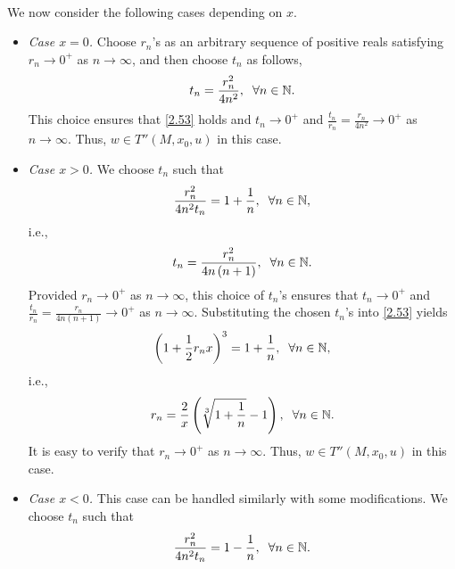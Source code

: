 \documentclass[a4paper]{article}
\numberwithin{equation}{section}
\begin{document}
\begin{enumerate}
\begin{enumerate}
\begin{align}
\end{align}
We now consider the following cases depending on $x$.
\begin{itemize}
\item \textit{Case $x=0$.} Choose $r_n$'s as an arbitrary sequence of positive reals satisfying $r_n\to 0^+$ as $n\to \infty$, and then choose $t_n$ as follows, 
\begin{align}
{t_n} = \frac{{r_n^2}}{{4{n^2}}},\hspace{0.2cm}\forall n \in \mathbb{N}.
\end{align}
This choice ensures that \eqref{2.53} holds and $t_n\to 0^+$ and $\frac{{{t_n}}}{{{r_n}}} = \frac{{{r_n}}}{{4{n^2}}} \to 0^+$ as $n\to \infty$. Thus, $w\in T''\left(M,x_0,u\right)$ in this case.
\item \textit{Case $x>0$.} We choose $t_n$ such that
\begin{align}
\frac{{r_n^2}}{{4{n^2}{t_n}}} = 1 + \frac{1}{n},\hspace{0.2cm}\forall n \in \mathbb{N},
\end{align}
i.e.,
\begin{align}
{t_n} = \frac{{r_n^2}}{{4n\left( {n + 1} \right)}},\hspace{0.2cm}\forall n \in \mathbb{N}.
\end{align}
Provided $r_n\to 0^+$ as $n\to \infty$, this choice of $t_n$'s ensures that $t_n\to 0^+$ and $\frac{{{t_n}}}{{{r_n}}} = \frac{{{r_n}}}{{4n\left( {n + 1} \right)}} \to {0^ + }$ as $n\to \infty$. Substituting the chosen $t_n$'s into \eqref{2.53} yields
\begin{align}
{\left( {1 + \frac{1}{2}{r_n}x} \right)^3} = 1 + \frac{1}{n},\hspace{0.2cm}\forall n \in \mathbb{N},
\end{align}
i.e.,
\begin{align}
{r_n} = \frac{2}{x}\left( {\sqrt[3]{{1 + \frac{1}{n}}} - 1} \right),\hspace{0.2cm}\forall n \in \mathbb{N}. 
\end{align}
It is easy to verify that $r_n\to 0^+$ as $n\to \infty$. Thus, $w\in T''\left(M,x_0,u\right)$ in this case.
\item \textit{Case $x<0$.} This case can be handled similarly with some modifications. We choose $t_n$ such that
\begin{align}
\frac{{r_n^2}}{{4{n^2}{t_n}}} = 1 - \frac{1}{n},\hspace{0.2cm}\forall n \in \mathbb{N}.
\end{align}

\end{itemize}
\end{enumerate}
\end{enumerate}
\end{document}
